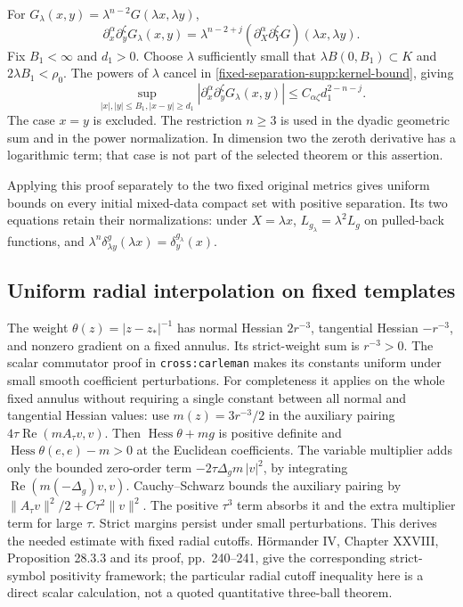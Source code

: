 \documentclass[11pt]{article}
\theoremstyle{definition}
\theoremstyle{remark}
\numberwithin{equation}{section}
\begin{document}
For $G_\lambda(x,y)=\lambda^{n-2}G(\lambda x,\lambda y)$,
\begin{equation}\label{fixed-separation-supp:scaling}
 \partial_x^\alpha\partial_y^\zeta G_\lambda(x,y)
 =\lambda^{n-2+j}
  (\partial_X^\alpha\partial_Y^\zeta G)(\lambda x,\lambda y).
\end{equation}
Fix $B_1<\infty$ and $d_1>0$. Choose $\lambda$ sufficiently small
that $\lambda B(0,B_1)\subset K$ and $2\lambda B_1<\rho_0$.
The powers of $\lambda$ cancel in
\eqref{fixed-separation-supp:kernel-bound}, giving
\begin{equation}\label{fixed-separation-supp:scaled-bound}
 \sup_{|x|,|y|\le B_1, |x-y|\ge d_1}
 |\partial_x^\alpha\partial_y^\zeta G_\lambda(x,y)|
 \le C_{\alpha\zeta}d_1^{2-n-j}.
\end{equation}
The case $x=y$ is excluded. The restriction $n\ge3$ is used in the
dyadic geometric sum and in the power normalization. In dimension two
the zeroth derivative has a logarithmic term; that case is not part of
the selected theorem or this assertion.

Applying this proof separately to the two fixed original metrics gives
uniform bounds on every initial mixed-data compact set with positive
separation. Its two equations retain their normalizations: under
$X=\lambda x$, $L_{g_\lambda}=\lambda^2L_g$ on pulled-back functions,
and $\lambda^n\delta^g_{\lambda y}(\lambda x)=\delta_y^{g_\lambda}(x)$.

\subsection{Uniform radial interpolation on fixed templates}
\label{fixed-separation-supp:radial}

The weight $\theta(z)=|z-z_*|^{-1}$ has normal Hessian $2r^{-3}$,
tangential Hessian $-r^{-3}$, and nonzero gradient on a fixed annulus.
Its strict-weight sum is $r^{-3}>0$. The scalar commutator proof in
\texttt{cross:carleman} makes its constants uniform under small smooth
coefficient perturbations. For completeness it applies on the whole
fixed annulus without requiring a single constant between all normal
and tangential Hessian values: use $m(z)=3r^{-3}/2$ in the auxiliary
pairing $4\tau\operatorname{Re}(mA_\tau v,v)$. Then
$\operatorname{Hess}\theta+mg$ is positive definite and
$\operatorname{Hess}\theta(e,e)-m>0$ at the Euclidean coefficients.
The variable multiplier adds only the bounded zero-order term
$-2\tau\Delta_gm\,|v|^2$, by integrating
$\operatorname{Re}(m(-\Delta_g)v,v)$. Cauchy--Schwarz bounds the
auxiliary pairing by $\|A_\tau v\|^2/2+C\tau^2\|v\|^2$.
The positive $\tau^3$ term absorbs it and the extra multiplier term for
large $\tau$. Strict margins persist under small perturbations. This
derives the needed estimate with fixed radial cutoffs. H\"ormander IV,
Chapter XXVIII, Proposition 28.3.3 and its proof, pp.~240--241, give the
corresponding strict-symbol positivity framework; the particular radial
cutoff inequality here is a direct scalar calculation, not a quoted
quantitative three-ball theorem.
\end{document}
